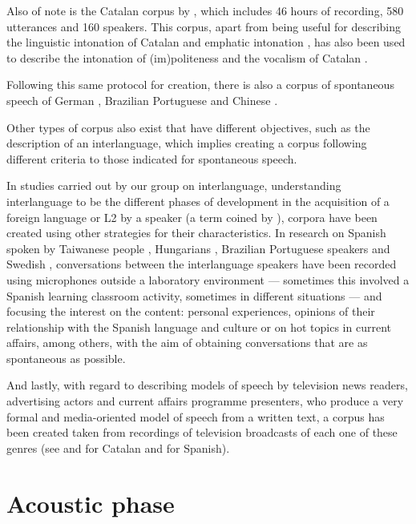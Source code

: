 \documentclass[output=paper]{langscibook}
\begin{document}
Also of note is the Catalan corpus by \citet{FontRotches.2006}, which includes 46 hours of recording, 580 utterances and 160 speakers. This corpus, apart from being useful for describing the linguistic intonation of Catalan \citep{FontRotches.2007} and emphatic intonation \citep{FontRotches.2011}, has also been used to describe the intonation of (im)politeness \citep{DevisHerraiz.CanteroSerena.2014} and the vocalism of Catalan \citep{RiusEscude.2015}.

Following this same protocol for creation, there is also a corpus of spontaneous speech of German \citep{TorregrosaAzor.2011}, Brazilian Portuguese \citep{Araujo.2014,Mendes.2013} and Chinese \citep{Kao.2011}. 

Other types of corpus also exist that have different objectives, such as the description of an interlanguage, which implies creating a corpus following different criteria to those indicated for spontaneous speech.

In studies carried out by our group on interlanguage, understanding interlanguage to be the different phases of development in the acquisition of a foreign language or L2 by a speaker (a term coined by \citealt{Selinker.1972}), corpora have been created using other strategies for their characteristics. In research on Spanish spoken by Taiwanese people \citep{Liu2005}, Hungarians \citep{BaditznePalvoelgyi2012}, Brazilian Portuguese speakers \citep{FonsecadeOliveira.2013} and Swedish \citep{Martorell.2010}, conversations between the interlanguage speakers have been recorded using microphones outside a laboratory environment — sometimes this involved a Spanish learning classroom activity, sometimes in different situations — and focusing the interest on the content: personal experiences, opinions of their relationship with the Spanish language and culture or on hot topics in current affairs, among others, with the aim of obtaining conversations that are as spontaneous as possible. 

And lastly, with regard to describing models of speech by television news readers, advertising actors and current affairs programme presenters, who produce a very formal and media-oriented model of speech from a written text, a corpus has been created taken from recordings of television broadcasts of each one of these genres (see \citealt{FontRotchesPaloma.2013} and \citealt{Torrent.2012,Torrent.2015} for Catalan and \citealt{FontRotchesMachucaAyuso.2010,FontRotches.2011} for Spanish). 

\section{Acoustic phase}
\end{document}
